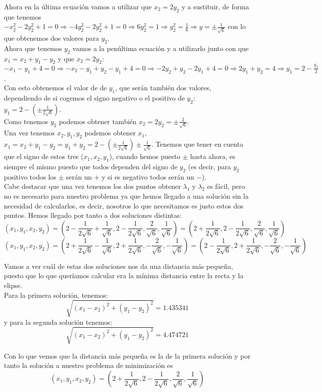 \documentclass[12pt]{article}
\theoremstyle{definition}
\begin{document}
\begin{pregunta}
Ahora en la última ecuación vamos a utilizar que $x_2=2y_2$ y a sustituir, de forma que tenemos $-x_2^2-2y_2^2+1=0 \Rightarrow -4y_2^2-2y_2^2+1=0 \Rightarrow 6y_2^2=1 \Rightarrow y_2^2 = \frac{1}{6} \Rightarrow y=\pm\frac{1}{\sqrt{6}}$ con lo que obtenemos dos valores para $y_2$.\\

Ahora que tenemos $y_2$ vamos a la penúltima ecuación y a utilizarlo junto con que $x_1=x_2+y_1-y_2$ y que $x_2=2y_2$: $-x_1-y_1+4=0 \Rightarrow -x_2-y_1+y_2-y_1+4=0 \Rightarrow -2y_2+y_2-2y_1+4=0 \Rightarrow 2y_1+y_2=4 \Rightarrow y_1=2-\frac{y_2}{2}$.\\
Con esto obtenemos el valor de de $y_1$, que serán también dos valores, dependiendo de si cogemos el signo negativo o el positivo de $y_2$: $y_1=2-(\pm\frac{1}{2\sqrt{6}})$.\\

Como tenemos $y_2$ podemos obtener también $x_2=2y_2=\pm\frac{2}{\sqrt{6}}$.\\
Una vez tenemos $x_2,y_1,y_2$ podemos obtener $x_1$, $x_1=x_2+y_1-y_2=y_1+y_2=2-(\pm\frac{1}{2\sqrt{6}})\pm\frac{1}{\sqrt{6}}$. Tenemos que tener en cuenta que el signo de estos tres ($x_1,x_2,y_1$), cuando hemos puesto $\pm$ hasta ahora, es siempre el mismo puesto que todos dependen del signo de $y_2$ (es decir, para $y_2$ positivo todos los $\pm$ serán un $+$ y si es negativo todos serán un $-$).\\

Cabe destacar que una vez tenemos los dos puntos obtener $\lambda_1$ y $\lambda_2$ es fácil, pero no es necesario para nuestro problema ya que hemos llegado a una solución sin la necesidad de calcularlos, es decir, nosotros lo que necesitamos es justo estos dos puntos. Hemos llegado por tanto a dos soluciones distintas:
\[
	(x_1,y_1,x_2,y_2)=(2-\frac{1}{2\sqrt{6}}+\frac{1}{\sqrt{6}},2-\frac{1}{2\sqrt{6}}, \frac{2}{\sqrt{6}}, \frac{1}{\sqrt{6}}) =  (2+\frac{1}{2\sqrt{6}},2-\frac{1}{2\sqrt{6}}, \frac{2}{\sqrt{6}}, \frac{1}{\sqrt{6}})
\]
\[
	(x_1,y_1,x_2,y_2)=(2+\frac{1}{2\sqrt{6}}-\frac{1}{\sqrt{6}},2+\frac{1}{2\sqrt{6}}, -\frac{2}{\sqrt{6}}, -\frac{1}{\sqrt{6}}) =  (2-\frac{1}{2\sqrt{6}},2+\frac{1}{2\sqrt{6}}, -\frac{2}{\sqrt{6}}, -\frac{1}{\sqrt{6}})
\]

Vamos a ver cuál de estas dos soluciones nos da una distancia más pequeña, puesto que lo que queríamos calcular era la mínima distancia entre la recta y la elipse.\\
Para la primera solución, tenemos:
\[
	\sqrt{(x_1-x_2)^2+(y_1-y_2)^2} = 1.435341
\]
y para la segunda solución tenemos:
\[
	\sqrt{(x_1-x_2)^2+(y_1-y_2)^2} = 4.474721
\]

Con lo que vemos que la distancia más pequeña es la de la primera solución y por tanto la solución a nuestro problema de minimización es 
\[
	(x_1,y_1,x_2,y_2)=(2+\frac{1}{2\sqrt{6}},2-\frac{1}{2\sqrt{6}}, \frac{2}{\sqrt{6}}, \frac{1}{\sqrt{6}})
\]
\end{pregunta}
\end{document}
